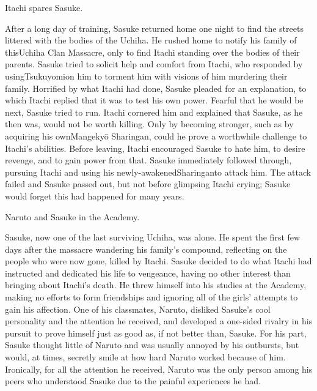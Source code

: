 \documentclass[a4paper,12pt]{article}
\begin{document}
Itachi spares Sasuke.\\ \par \vspace{0.5cm}

After a long day of training, Sasuke returned home one night to find the streets littered with the bodies of the Uchiha. He rushed home to notify his family of thisUchiha Clan Massacre, only to find Itachi standing over the bodies of their parents. Sasuke tried to solicit help and comfort from Itachi, who responded by usingTsukuyomion him to torment him with visions of him murdering their family. Horrified by what Itachi had done, Sasuke pleaded for an explanation, to which Itachi replied that it was to test his own power. Fearful that he would be next, Sasuke tried to run. Itachi cornered him and explained that Sasuke, as he then was, would not be worth killing. Only by becoming stronger, such as by acquiring his ownMangekyō Sharingan, could he prove a worthwhile challenge to Itachi's abilities. Before leaving, Itachi encouraged Sasuke to hate him, to desire revenge, and to gain power from that. Sasuke immediately followed through, pursuing Itachi and using his newly-awakenedSharinganto attack him. The attack failed and Sasuke passed out, but not before glimpsing Itachi crying; Sasuke would forget this had happened for many years.\\ \par \vspace{0.5cm}

Naruto and Sasuke in the Academy.\\ \par \vspace{0.5cm}

Sasuke, now one of the last surviving Uchiha, was alone. He spent the first few days after the massacre wandering his family's compound, reflecting on the people who were now gone, killed by Itachi. Sasuke decided to do what Itachi had instructed and dedicated his life to vengeance, having no other interest than bringing about Itachi's death. He threw himself into his studies at the Academy, making no efforts to form friendships and ignoring all of the girls' attempts to gain his affection. One of his classmates, Naruto, disliked Sasuke's cool personality and the attention he received, and developed a one-sided rivalry in his pursuit to prove himself just as good as, if not better than, Sasuke. For his part, Sasuke thought little of Naruto and was usually annoyed by his outbursts, but would, at times, secretly smile at how hard Naruto worked because of him. Ironically, for all the attention he received, Naruto was the only person among his peers who understood Sasuke due to the painful experiences he had.\\ \par \vspace{0.5cm}
\end{document}
